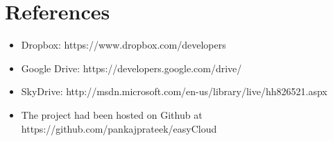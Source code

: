 \documentclass{article}
\begin{document}
\section{References}
\begin{itemize}
\item Dropbox: https://www.dropbox.com/developers
\item Google Drive: https://developers.google.com/drive/ 
\item SkyDrive: http://msdn.microsoft.com/en-us/library/live/hh826521.aspx 
\item The project had been hosted on Github at https://github.com/pankajprateek/easyCloud
\end{itemize}
\end{document}
